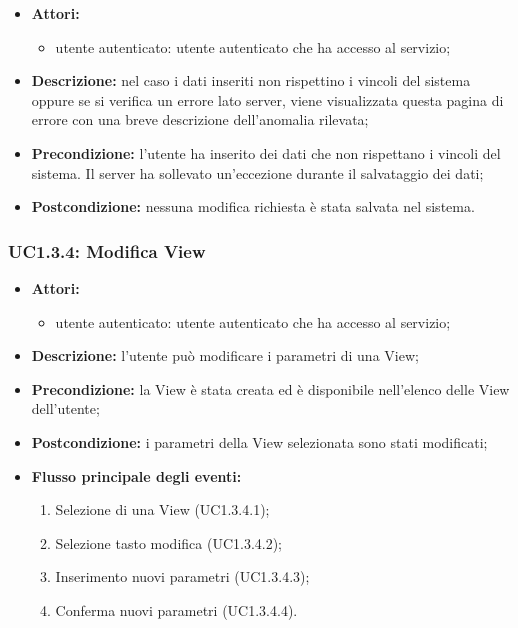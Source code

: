 \begin{itemize}
	\item \textbf{Attori:}
	\begin{itemize}
		\item utente autenticato: utente autenticato che ha accesso al servizio;
	\end{itemize}
	\item \textbf{Descrizione:} nel caso i dati inseriti non rispettino i vincoli del sistema oppure se si verifica un errore lato server, viene visualizzata questa pagina di errore con una breve descrizione dell'anomalia rilevata;
	\item \textbf{Precondizione:} l'utente ha inserito dei dati che non rispettano i vincoli del sistema. Il server ha sollevato un'eccezione durante il salvataggio dei dati;
	\item \textbf{Postcondizione:} nessuna modifica richiesta è stata salvata nel sistema.
\end{itemize}

\subsubsection{UC1.3.4: Modifica View}

\begin{itemize}
	\item \textbf{Attori:}
	\begin{itemize}
		\item utente autenticato: utente autenticato che ha accesso al servizio;
	\end{itemize}
	\item \textbf{Descrizione:} l'utente può modificare i parametri di una View;
	\item \textbf{Precondizione:} la View è stata creata ed è disponibile nell'elenco delle View dell'utente;
	\item \textbf{Postcondizione:} i parametri della View selezionata sono stati modificati;
	\item \textbf{Flusso principale degli eventi:}
	\begin{enumerate}
		\item Selezione di una View (UC1.3.4.1);
		\item Selezione tasto modifica (UC1.3.4.2);
		\item Inserimento nuovi parametri (UC1.3.4.3);
		\item Conferma nuovi parametri (UC1.3.4.4).
	\end{enumerate}
\end{itemize}

